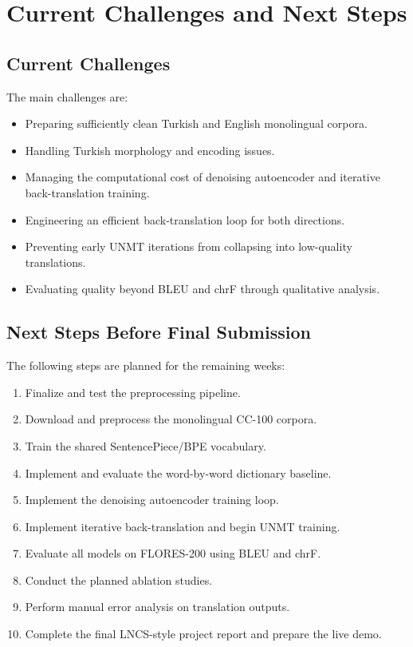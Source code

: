 \documentclass[11pt]{article}
\begin{document}
\section{Current Challenges and Next Steps}

\subsection{Current Challenges}

The main challenges are:
\begin{itemize}
    \item Preparing sufficiently clean Turkish and English monolingual corpora.
    \item Handling Turkish morphology and encoding issues.
    \item Managing the computational cost of denoising autoencoder and iterative back-translation training.
    \item Engineering an efficient back-translation loop for both directions.
    \item Preventing early UNMT iterations from collapsing into low-quality translations.
    \item Evaluating quality beyond BLEU and chrF through qualitative analysis.
\end{itemize}

\subsection{Next Steps Before Final Submission}

The following steps are planned for the remaining weeks:

\begin{enumerate}
    \item Finalize and test the preprocessing pipeline.
    \item Download and preprocess the monolingual CC-100 corpora.
    \item Train the shared SentencePiece/BPE vocabulary.
    \item Implement and evaluate the word-by-word dictionary baseline.
    \item Implement the denoising autoencoder training loop.
    \item Implement iterative back-translation and begin UNMT training.
    \item Evaluate all models on FLORES-200 using BLEU and chrF.
    \item Conduct the planned ablation studies.
    \item Perform manual error analysis on translation outputs.
    \item Complete the final LNCS-style project report and prepare the live demo.
\end{enumerate}
\end{document}
